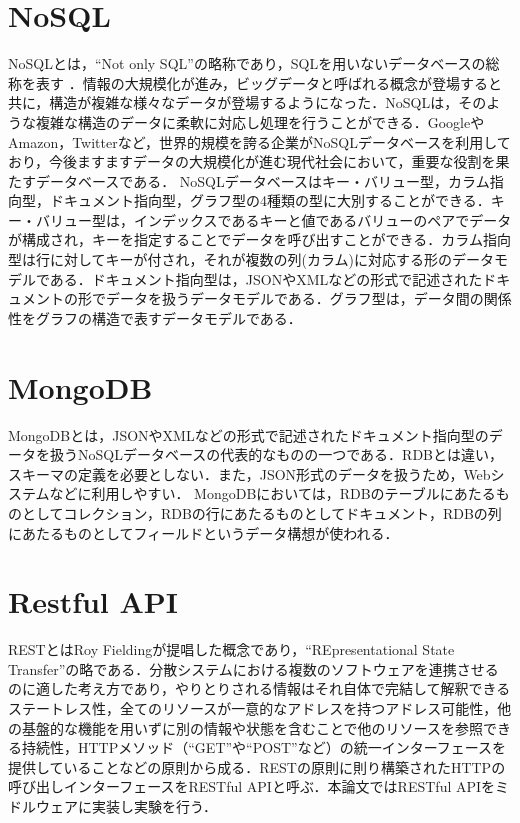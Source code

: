 \documentclass[a4paper,11pt]{ujreport}
\begin{document}
\section{NoSQL}
NoSQLとは，“Not only SQL”の略称であり，SQLを用いないデータベースの総称を表す \cite{太田201204}．情報の大規模化が進み，ビッグデータと呼ばれる概念が登場すると共に，構造が複雑な様々なデータが登場するようになった．NoSQLは，そのような複雑な構造のデータに柔軟に対応し処理を行うことができる．GoogleやAmazon，Twitterなど，世界的規模を誇る企業がNoSQLデータベースを利用しており，今後ますますデータの大規模化が進む現代社会において，重要な役割を果たすデータベースである\cite{太田201204}．
NoSQLデータベースはキー・バリュー型，カラム指向型，ドキュメント指向型，グラフ型の4種類の型に大別することができる．キー・バリュー型は，インデックスであるキーと値であるバリューのペアでデータが構成され，キーを指定することでデータを呼び出すことができる．カラム指向型は行に対してキーが付され，それが複数の列(カラム)に対応する形のデータモデルである．ドキュメント指向型は，JSONやXMLなどの形式で記述されたドキュメントの形でデータを扱うデータモデルである．グラフ型は，データ間の関係性をグラフの構造で表すデータモデルである\cite{太田201204}．

\section{MongoDB}
MongoDBとは，JSONやXMLなどの形式で記述されたドキュメント指向型のデータを扱うNoSQLデータベースの代表的なものの一つである．RDBとは違い，スキーマの定義を必要としない\cite{太田201204}\cite{mongodb}．また，JSON形式のデータを扱うため，Webシステムなどに利用しやすい．
MongoDBにおいては，RDBのテーブルにあたるものとしてコレクション，RDBの行にあたるものとしてドキュメント，RDBの列にあたるものとしてフィールドというデータ構想が使われる．

\section{Restful API}
RESTとはRoy Fieldingが提唱した概念であり\cite{fielding2000architectural}，“REpresentational State Transfer”の略である．分散システムにおける複数のソフトウェアを連携させるのに適した考え方であり，やりとりされる情報はそれ自体で完結して解釈できるステートレス性，全てのリソースが一意的なアドレスを持つアドレス可能性，他の基盤的な機能を用いずに別の情報や状態を含むことで他のリソースを参照できる持続性，HTTPメソッド（“GET”や“POST”など）の統一インターフェースを提供していることなどの原則から成る．RESTの原則に則り構築されたHTTPの呼び出しインターフェースをRESTful APIと呼ぶ．本論文ではRESTful APIをミドルウェアに実装し実験を行う．
\end{document}
